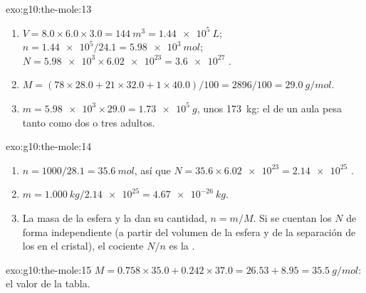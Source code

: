 \begin{solution}{exo:g10:the-mole:13}
\begin{enumerate}
  \item $V = 8.0 \times 6.0 \times 3.0 = \qty{144}{m^3} =
        \qty{1.44e5}{L}$; $n = \num{1.44e5} / 24.1 = \qty{5.98e3}{mol}$;
        $N = \num{5.98e3} \times \num{6.02e23} = \num{3.6e27}$ .
  \item $M = (78 \times 28.0 + 21 \times 32.0 + 1 \times 40.0) / 100 =
        2896 / 100 = \qty{29.0}{g/mol}$.
  \item $m = \num{5.98e3} \times 29.0 = \qty{1.73e5}{g}$, unos
        \qty{173}{kg}: el  de un aula pesa tanto como dos o tres
        adultos.
\end{enumerate}
\end{solution}

\begin{solution}{exo:g10:the-mole:14}
\begin{enumerate}
  \item $n = 1000 / 28.1 = \qty{35.6}{mol}$, así que
        $N = 35.6 \times \num{6.02e23} = \num{2.14e25}$ .
  \item $m = \qty{1.000}{kg} / \num{2.14e25} = \qty{4.67e-26}{kg}$.
  \item La masa de la esfera y la  dan su cantidad,
        $n = m / M$. Si se cuentan los  $N$ de forma independiente
        (a partir del volumen de la esfera y de la separación de los
         en el cristal), el cociente $N / n$ es la .
\end{enumerate}
\end{solution}

\begin{solution}{exo:g10:the-mole:15}
$M = 0.758 \times 35.0 + 0.242 \times 37.0 = 26.53 + 8.95 =
\qty{35.5}{g/mol}$: el valor de la tabla.
\end{solution}

